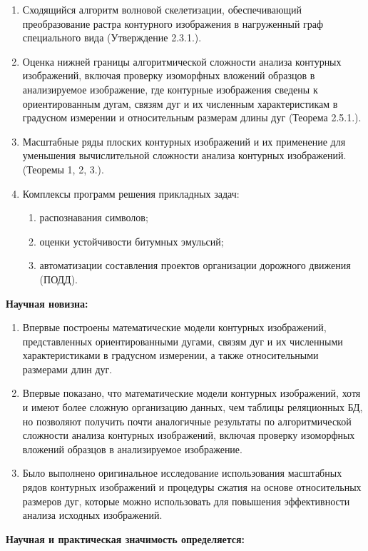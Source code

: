 \begin{enumerate}
\item Сходящийся алгоритм волновой скелетизации,  обеспечивающий преобразование растра контурного изображения в нагруженный граф специального вида (Утверждение 2.3.1.).
\item Оценка нижней границы алгоритмической сложности  анализа контурных изображений, включая проверку изоморфных вложений образцов в анализируемое изображение, где контурные изображения сведены к ориентированным дугам, связям дуг и их численным характеристикам в градусном измерении и  относительным размерам  длины дуг  (Теорема 2.5.1.).
\item Масштабные ряды плоских контурных изображений и их применение для уменьшения  вычислительной сложности анализа контурных изображений.  (Теоремы 1, 2, 3.).
\item Комплексы программ  решения прикладных задач:
 \begin{enumerate}
   \item распознавания символов;
   \item оценки устойчивости битумных эмульсий;
   \item автоматизации составления проектов организации дорожного движения (ПОДД). 
 \end{enumerate}
\end{enumerate}   

\textbf{Научная новизна:}

\begin{enumerate}
\item Впервые построены математические модели контурных изображений, представленных ориентированными дугами, связям дуг и их численными характеристиками в градусном измерении,  а также  относительными размерами  длин дуг.  
\item Впервые  показано, что математические модели контурных изображений, хотя и имеют более сложную организацию данных, чем  таблицы реляционных БД, но позволяют получить почти аналогичные результаты по алгоритмической сложности  анализа контурных изображений, включая проверку изоморфных вложений образцов в анализируемое изображение.
\item Было выполнено оригинальное исследование использования масштабных рядов контурных изображений и процедуры сжатия на  основе относительных размеров дуг, которые можно использовать для повышения эффективности анализа исходных изображений.
\end{enumerate}   

\noindent
\textbf{Научная и практическая значимость определяется:}


